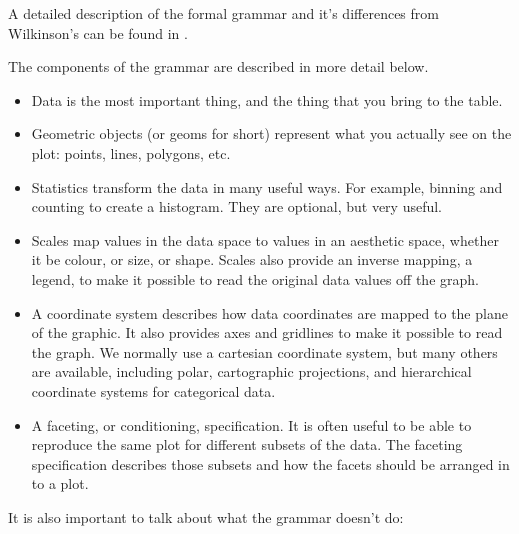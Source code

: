 A detailed description of the formal grammar and it's differences from Wilkinson's can be found in \citet{wickham:2007d}.

The components of the grammar are described in more detail below.

\begin{itemize}
	\item Data is the most important thing, and the thing that you bring to the table.
	\item Geometric objects (or geoms for short) represent what you actually see on the plot: points, lines, polygons, etc.
	\item Statistics transform the data in many useful ways.  For example, binning and counting to create a histogram.  They are optional, but very useful.
	\item Scales map values in the data space to values in an aesthetic space, whether it be colour, or size, or shape.  Scales also provide an inverse mapping, a legend, to make it possible to read the original data values off the graph.
	\item A coordinate system describes how data coordinates are mapped to the plane of the graphic.  It also provides axes and gridlines to make it possible to read the graph.  We normally use a cartesian coordinate system, but many others are available, including polar, cartographic projections, and hierarchical coordinate systems for categorical data.
	\item A faceting, or conditioning, specification.  It is often useful to be able to reproduce the same plot for different subsets of the data.  The faceting specification describes those subsets and how the facets should be arranged in to a plot.
\end{itemize}

It is also important to talk about what the grammar doesn't do:

